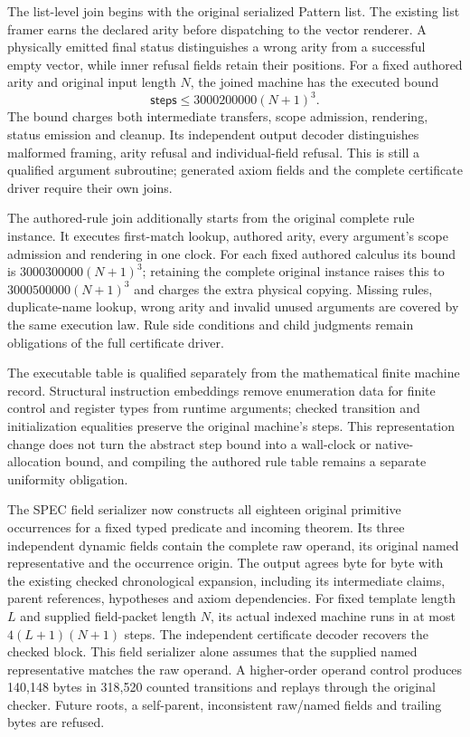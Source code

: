 \documentclass[11pt]{article}
\begin{document}
The list-level join begins with the original serialized Pattern list.
The existing list framer earns the declared arity before dispatching to the
vector renderer. A physically emitted final status distinguishes a wrong
arity from a successful empty vector, while inner refusal fields retain
their positions. For a fixed authored arity and original input length $N$,
the joined machine has the executed bound
\[
  \mathsf{steps}\le 3000200000(N+1)^3.
\]
The bound charges both intermediate transfers, scope admission, rendering,
status emission and cleanup. Its independent output decoder distinguishes
malformed framing, arity refusal and individual-field refusal. This is
still a qualified argument subroutine; generated axiom fields and the
complete certificate driver require their own joins.

The authored-rule join additionally starts from the original complete rule
instance. It executes first-match lookup, authored arity, every argument's
scope admission and rendering in one clock. For each fixed authored
calculus its bound is $3000300000(N+1)^3$; retaining the complete original
instance raises this to $3000500000(N+1)^3$ and charges the extra physical
copying. Missing rules, duplicate-name lookup, wrong arity and invalid unused
arguments are covered by the same execution law. Rule side conditions and
child judgments remain obligations of the full certificate driver.

The executable table is qualified separately from the mathematical finite
machine record. Structural instruction embeddings remove enumeration data
for finite control and register types from runtime arguments; checked
transition and initialization equalities preserve the original machine's
steps. This representation change does not turn the abstract step bound into
a wall-clock or native-allocation bound, and compiling the authored rule
table remains a separate uniformity obligation.

The SPEC field serializer now constructs all eighteen original primitive
occurrences for a fixed typed predicate and incoming theorem. Its three
independent dynamic fields contain the complete raw operand, its original
named representative and the occurrence origin. The output agrees byte for
byte with the existing checked chronological expansion, including its
intermediate claims, parent references, hypotheses and axiom dependencies.
For fixed template length $L$ and supplied field-packet length $N$, its
actual indexed machine runs in at most $4(L+1)(N+1)$ steps. The independent
certificate decoder recovers the checked block. This field serializer alone
assumes that the supplied named representative matches the raw operand.
A higher-order operand control produces 140,148 bytes in 318,520 counted
transitions and replays through the original checker. Future roots, a
self-parent, inconsistent raw/named fields and trailing bytes are refused.
\end{document}
